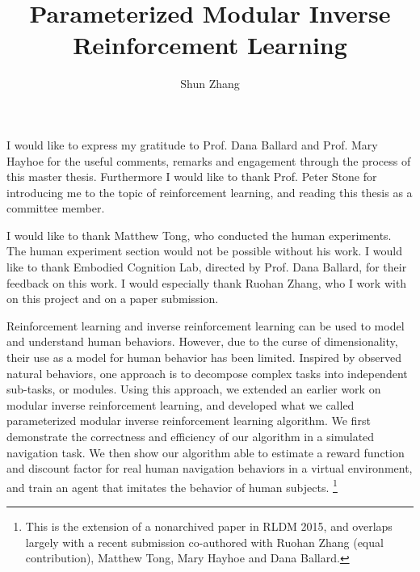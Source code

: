 \documentclass[12pt]{report}	%
\author{Shun Zhang}
\title{Parameterized Modular Inverse Reinforcement Learning}
\theoremstyle{definition}
\theoremstyle{remark}
\begin{document}
\copyrightpage          %


%
%
%
\commcertpage           %

\titlepage              %



%
\begin{acknowledgments}		%
%
I would like to express my gratitude to Prof. Dana Ballard and Prof. Mary Hayhoe
for the useful comments, remarks and engagement through the process of this
master thesis. Furthermore I would like to thank Prof. Peter Stone for
introducing me to the topic of reinforcement learning, and reading this thesis
as a committee member.

I would like to thank Matthew Tong, who conducted the human experiments. The
human experiment section would not be possible without his work. I would
like to thank Embodied Cognition Lab, directed by Prof. Dana Ballard, for their
feedback on this work. I would especially thank Ruohan Zhang, who I work with on
this project and on a paper submission.
\end{acknowledgments}


%
\utabstract
{}%
Reinforcement learning and inverse reinforcement learning can be used to model
and understand human behaviors. However, due to the curse of dimensionality,
their use as a model for human behavior has been limited. Inspired by observed
natural behaviors, one approach is to decompose complex tasks into independent
sub-tasks, or modules. Using this approach, we extended an earlier work on 
modular inverse reinforcement learning, and developed what we called
parameterized modular inverse reinforcement learning algorithm. We first
demonstrate the correctness and efficiency of our algorithm in a simulated
navigation task. We then show our algorithm able to estimate a reward function
and discount factor for real human navigation behaviors in a virtual
environment, and train an agent that imitates the behavior of human subjects.
\footnote{This is the extension of a nonarchived paper in RLDM 2015, and
overlaps largely with a recent submission co-authored with Ruohan Zhang (equal
contribution), Matthew Tong, Mary Hayhoe and Dana Ballard.}
\indent
\end{document}
